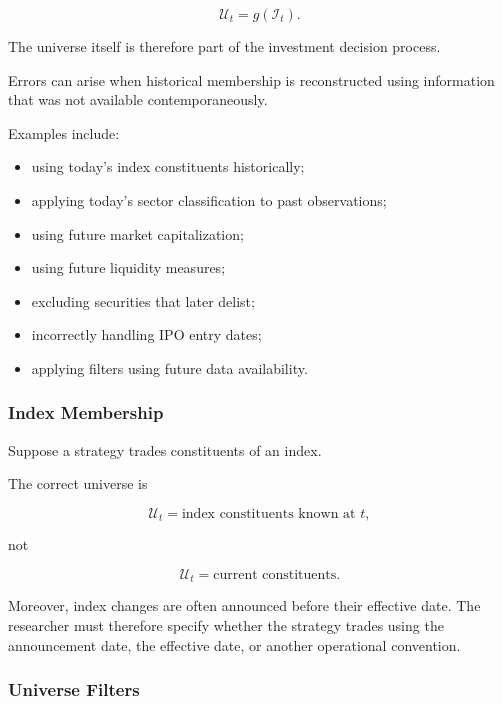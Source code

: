 \documentclass[11pt,a4paper]{article}
\begin{document}
\begin{equation}
\mathcal{U}_t
=
g
\left(
\mathcal{I}_t
\right).
\end{equation}

The universe itself is therefore part of the investment decision process.

Errors can arise when historical membership is reconstructed using information
that was not available contemporaneously.

Examples include:

\begin{itemize}
    \item using today's index constituents historically;
    \item applying today's sector classification to past observations;
    \item using future market capitalization;
    \item using future liquidity measures;
    \item excluding securities that later delist;
    \item incorrectly handling IPO entry dates;
    \item applying filters using future data availability.
\end{itemize}


\subsubsection{Index Membership}

Suppose a strategy trades constituents of an index.

The correct universe is

\begin{equation}
\mathcal{U}_t
=
\text{index constituents known at }t,
\end{equation}

not

\begin{equation}
\mathcal{U}_t
=
\text{current constituents}.
\end{equation}

Moreover, index changes are often announced before their effective date. The
researcher must therefore specify whether the strategy trades using the
announcement date, the effective date, or another operational convention.


\subsubsection{Universe Filters}
\end{document}

